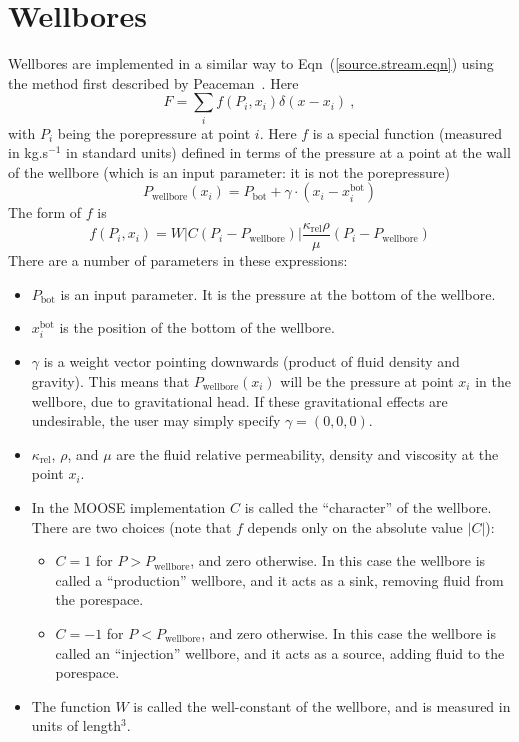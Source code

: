 \documentclass[]{scrreprt}
\begin{document}
\section{Wellbores}

Wellbores are implemented in a similar way to
Eqn~(\ref{source.stream.eqn}) using the method first described by
Peaceman~\cite{peaceman1983}.  Here  
\begin{equation}
F = \sum_{i}f(P_{i}, x_{i})\delta(x - x_{i}) \ ,
\end{equation}
with $P_{i}$ being the porepressure at point $i$.  Here $f$ is a
special function (measured in kg.s$^{-1}$ in standard 
units) defined in terms of the pressure at a
point at the wall of the wellbore (which is an input parameter: it is
not the porepressure) 
\begin{equation}
P_{\mathrm{wellbore}}(x_{i}) = P_{\mathrm{bot}} + \gamma \cdot (x_{i} -
x_{i}^{\mathrm{bot}})
\end{equation}
The form of $f$ is
\begin{equation}
f(P_{i}, x_{i}) = 
W \left|C(P_{i}-P_{\mathrm{wellbore}})\right|
\frac{\kappa_{\mathrm{rel}}\rho}{\mu}(P_{i} - P_{\mathrm{wellbore}})
\end{equation}
There are a number of parameters in these expressions:
\begin{itemize}
\item $P_{\mathrm{bot}}$ is an input parameter.  It is the pressure at
  the bottom of the wellbore.
\item $x_{i}^{\mathrm{bot}}$ is the position of the bottom of the wellbore.
\item $\gamma$ is a weight vector pointing downwards (product of fluid
  density and gravity).  This means that
  $P_{\mathrm{wellbore}}(x_{i})$ will be the pressure at point $x_{i}$
  in the wellbore, due to gravitational head.  If these
  gravitational effects are undesirable, the user may simply specify
  $\gamma = (0,0,0)$.
\item $\kappa_{\mathrm{rel}}$, $\rho$, and $\mu$ are the fluid
  relative permeability, density and viscosity at the point $x_{i}$.
\item In the MOOSE implementation $C$ is called the ``character'' of
  the wellbore.   There are two choices (note that $f$ depends only on
  the absolute value $|C|$):
\begin{itemize}
\item $C=1$ for $P>P_{\mathrm{wellbore}}$, and zero otherwise.  In
  this case the wellbore is called a ``production'' wellbore, and it
  acts as a sink, removing fluid from the porespace.
\item $C=-1$ for $P<P_{\mathrm{wellbore}}$, and zero otherwise.  In
  this case the wellbore is called an ``injection'' wellbore, and it
  acts as a source, adding fluid to the porespace.
\end{itemize}
\item The function $W$ is called the well-constant of the wellbore, and is
measured in units of length$^{3}$. 
\end{itemize}
\end{document}
